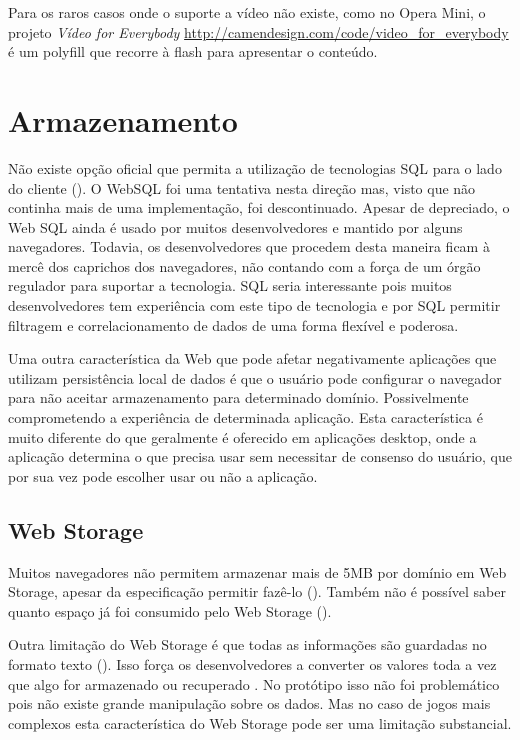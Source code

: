 Para os raros casos onde o suporte a vídeo não existe,
como no Opera Mini, o projeto \textit{Vídeo for Everybody}
\url{http://camendesign.com/code/video_for_everybody} é um polyfill que
recorre à flash para apresentar o conteúdo.

\section{Armazenamento}

Não existe opção oficial que permita a utilização de tecnologias
SQL para o lado do cliente (). O WebSQL foi uma
tentativa nesta direção mas, visto que não continha mais de uma
implementação, foi descontinuado. Apesar de depreciado, o Web SQL ainda
é usado por muitos desenvolvedores e mantido por alguns navegadores.
Todavia, os desenvolvedores que procedem desta maneira ficam à mercê
dos caprichos dos navegadores, não contando com a força de um
órgão regulador para suportar a tecnologia. SQL seria interessante pois
muitos desenvolvedores tem experiência com este tipo de tecnologia e
por SQL permitir filtragem e correlacionamento de dados de uma forma
flexível e poderosa.

Uma outra característica da Web que pode afetar negativamente
aplicações que utilizam  persistência local de dados é que o
usuário pode configurar o navegador para não aceitar armazenamento
para determinado domínio. Possivelmente comprometendo a experiência
de determinada aplicação. Esta característica é muito diferente do
que geralmente é oferecido em aplicações desktop, onde a aplicação
determina o que precisa usar sem necessitar de consenso do usuário, que
por sua vez pode escolher usar ou não a aplicação.

\subsection{Web Storage}

Muitos navegadores não permitem armazenar mais de 5MB por domínio
em Web Storage, apesar da especificação permitir fazê-lo
\textsc{\autocite{gameAssetManagement} (}). Também
não é possível saber quanto espaço já foi consumido pelo Web
Storage ().

Outra limitação do Web Storage é que todas as informações são
guardadas no formato texto (). Isso
força os desenvolvedores a converter os valores toda a vez que algo for
armazenado ou recuperado \textsc{\autocite{gameAssetManagement}}. No protótipo
isso não foi problemático pois não existe grande manipulação sobre
os dados. Mas no caso de jogos mais complexos esta característica do
Web Storage pode ser uma limitação substancial.

